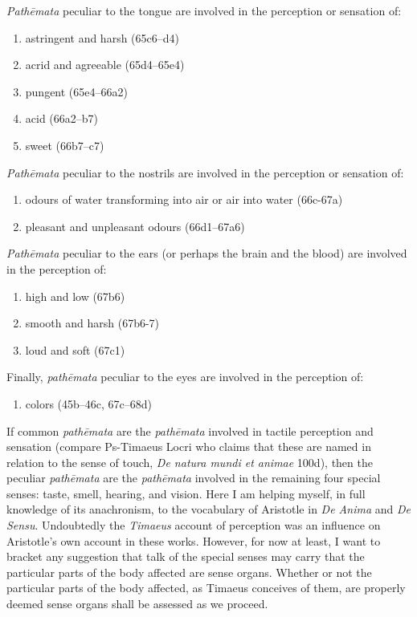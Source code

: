 \emph{Pathēmata} peculiar to the tongue are involved in the perception or sensation of:
\begin{enumerate}
	\item astringent and harsh (65c6--d4)
	\item acrid and agreeable (65d4--65e4)
	\item pungent (65e4--66a2)
	\item acid (66a2--b7)
	\item sweet (66b7--c7)
\end{enumerate}

\emph{Pathēmata} peculiar to the nostrils are involved in the perception or sensation of:
\begin{enumerate}
	\item odours of water transforming into air or air into water (66c-67a)
	\item pleasant and unpleasant odours (66d1--67a6)
\end{enumerate}

\emph{Pathēmata} peculiar to the ears (or perhaps the brain and the blood) are involved in the perception of:
\begin{enumerate}
	\item high and low (67b6)
	\item smooth and harsh (67b6-7)
	\item loud and soft (67c1)
\end{enumerate}

Finally, \emph{pathēmata} peculiar to the eyes are involved in the perception of:
\begin{enumerate}
	\item colors (45b--46c, 67c--68d)
\end{enumerate}

If common \emph{pathēmata} are the \emph{pathēmata} involved in tactile perception and sensation (compare Ps-Timaeus Locri who claims that these are named in relation to the sense of touch, \emph{De natura mundi et animae} 100d), then the peculiar \emph{pathēmata} are the \emph{pathēmata} involved in the remaining four special senses: taste, smell, hearing, and vision. Here I am helping myself, in full knowledge of its anachronism, to the vocabulary of Aristotle in \emph{De Anima} and \emph{De Sensu}. Undoubtedly the \emph{Timaeus} account of perception was an influence on Aristotle's own account in these works. However, for now at least, I want to bracket any suggestion that talk of the special senses may carry that the particular parts of the body affected are sense organs. Whether or not the particular parts of the body affected, as Timaeus conceives of them, are properly deemed sense organs shall be assessed as we proceed.

